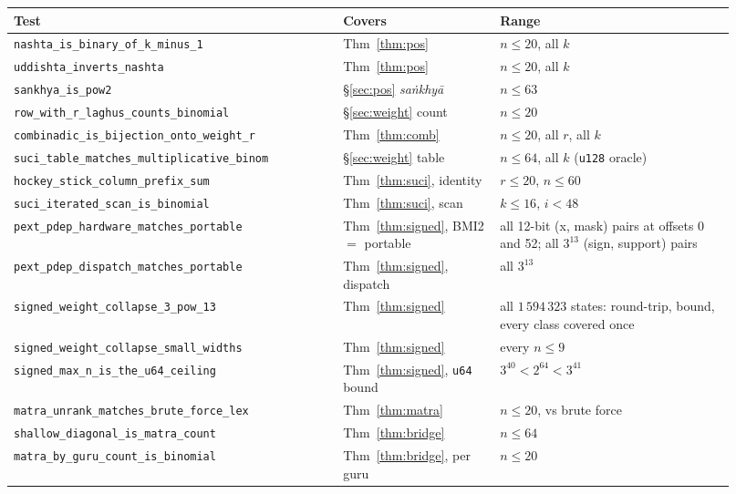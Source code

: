 \documentclass[11pt,letterpaper]{article}
\newcommand{\skt}[1]{\textit{#1}}
\newcommand{\code}[1]{\texttt{#1}}
\theoremstyle{plain}
\theoremstyle{remark}
\begin{document}
{\small
\begin{longtable}{@{}>{\raggedright\arraybackslash}p{0.42\linewidth}>{\raggedright\arraybackslash}p{0.2\linewidth}>{\raggedright\arraybackslash}p{0.3\linewidth}@{}}
\toprule
\textbf{Test} & \textbf{Covers} & \textbf{Range}\\
\midrule\endhead
\bottomrule\endfoot
\code{nashta\_is\_binary\_of\_k\_minus\_1} & Thm~\ref{thm:pos} & $n \le 20$, all $k$\\
\code{uddishta\_inverts\_nashta} & Thm~\ref{thm:pos} & $n \le 20$, all $k$\\
\code{sankhya\_is\_pow2} & §\ref{sec:pos} \skt{saṅkhyā} & $n \le 63$\\
\code{row\_with\_r\_laghus\_counts\_binomial} & §\ref{sec:weight} count & $n \le 20$\\
\code{combinadic\_is\_bijection\_onto\_weight\_r} & Thm~\ref{thm:comb} & $n \le 20$, all $r$, all $k$\\
\code{suci\_table\_matches\_multiplicative\_binom} & §\ref{sec:weight} table & $n \le 64$, all $k$ (\code{u128} oracle)\\
\code{hockey\_stick\_column\_prefix\_sum} & Thm~\ref{thm:suci}, identity & $r \le 20$, $n \le 60$\\
\code{suci\_iterated\_scan\_is\_binomial} & Thm~\ref{thm:suci}, scan & $k \le 16$, $i < 48$\\
\code{pext\_pdep\_hardware\_matches\_portable} & Thm~\ref{thm:signed}, BMI2 $=$ portable & all 12-bit (x, mask) pairs at offsets 0 and 52; all $3^{13}$ (sign, support) pairs\\
\code{pext\_pdep\_dispatch\_matches\_portable} & Thm~\ref{thm:signed}, dispatch & all $3^{13}$\\
\code{signed\_weight\_collapse\_3\_pow\_13} & Thm~\ref{thm:signed} & all $1\,594\,323$ states: round-trip, bound, every class covered once\\
\code{signed\_weight\_collapse\_small\_widths} & Thm~\ref{thm:signed} & every $n \le 9$\\
\code{signed\_max\_n\_is\_the\_u64\_ceiling} & Thm~\ref{thm:signed}, \code{u64} bound & $3^{40} < 2^{64} < 3^{41}$\\
\code{matra\_unrank\_matches\_brute\_force\_lex} & Thm~\ref{thm:matra} & $n \le 20$, vs brute force\\
\code{shallow\_diagonal\_is\_matra\_count} & Thm~\ref{thm:bridge} & $n \le 64$\\
\code{matra\_by\_guru\_count\_is\_binomial} & Thm~\ref{thm:bridge}, per guru & $n \le 20$\\
\end{longtable}
}
\end{document}

